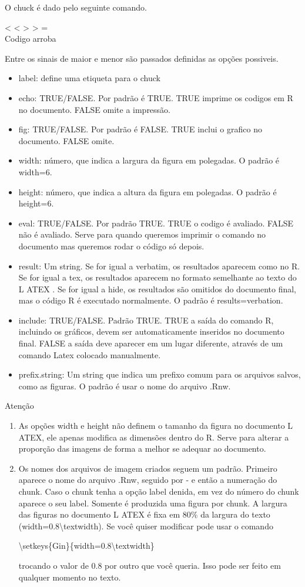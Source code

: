 \documentclass[12pt,twoside]{article}
\begin{document}
O chuck é dado pelo seguinte comando.
\begin{center}
< < > > =
\\Codigo
arroba
\end{center}
Entre os sinais de maior e menor são passados definidas as opções possiveis.
\begin{itemize}
\item label: define uma etiqueta para o chuck
\item echo: TRUE/FALSE. Por padrão é TRUE. TRUE imprime os codigos em R no documento. FALSE omite a impressão.
\item fig: TRUE/FALSE. Por padrão é FALSE. TRUE inclui o grafico no documento. FALSE omite.
\item width: número, que indica a largura da figura em polegadas. O padrão é width=6. 
\item  height: número, que indica a altura da figura em polegadas. O padrão é height=6.
\item eval: TRUE/FALSE. Por padrão TRUE. TRUE o codigo é avaliado. FALSE não é avaliado. Serve para quando queremos imprimir o comando no documento mas queremos rodar o código só depois.
\item result: Um string. Se for igual a verbatim, os resultados aparecem como no R. Se for igual a tex, os resultados aparecem no formato semelhante ao texto do L ATEX . Se for igual a hide, os resultados são omitidos do documento final, mas o código R é executado normalmente. O padrão é results=verbation.
\item include: TRUE/FALSE. Padrão TRUE. TRUE  a saída do comando R, incluindo os gráficos, devem ser automaticamente inseridos no documento final. FALSE  a saída deve aparecer em um lugar diferente, através de um comando Latex colocado manualmente.
\item prefix.string: Um string que indica um prefixo comum para os arquivos salvos, como as figuras. O padrão é usar o nome do arquivo .Rnw.
\end{itemize}
Atenção
\begin{enumerate}
\item As opções width e height não definem o tamanho da figura no documento L ATEX, ele apenas modifica as dimensões dentro do R. Serve para alterar a proporção das imagens de forma a melhor se adequar ao documento.
\item Os nomes dos arquivos de imagem criados seguem um padrão. Primeiro aparece o nome do arquivo .Rnw, seguido por - e então a numeração do chunk. Caso o chunk tenha a opção label denida, em vez do número do chunk aparece o seu label. Somente é produzida uma figura por chunk. A largura das figuras no documento L ATEX é fixa em 80\% da largura do texto (width=0.8\textbackslash textwidth). Se você quiser modificar pode usar o comando
\begin{center}
\textbackslash setkeys\{Gin\}\{width=0.8\textbackslash textwidth\}
\end{center}
trocando o valor de 0.8 por outro que você queria. Isso pode ser feito em qualquer momento no texto. 
\end{enumerate}
\end{document}
